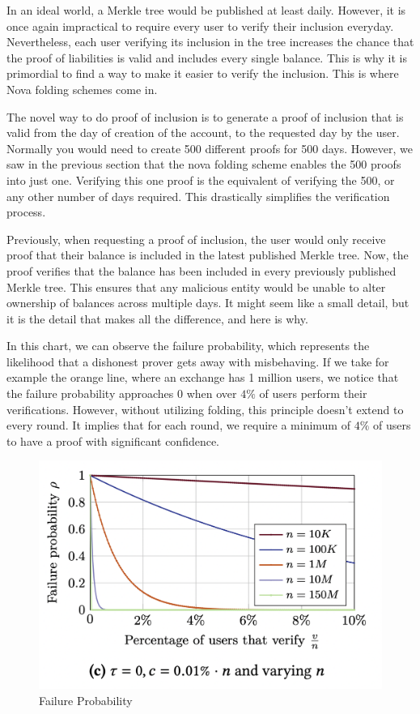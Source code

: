 In an ideal world, a Merkle tree would be published at least daily. However, it is once again impractical to require every user to verify their inclusion everyday.
Nevertheless, each user verifying its inclusion in the tree increases the chance that the proof of liabilities is valid and includes every single balance.
This is why it is primordial to find a way to make it easier to verify the inclusion. This is where Nova folding schemes come in.

The novel way to do proof of inclusion is to generate a proof of inclusion that is valid from the day of creation of the account, to the requested day by the user.
Normally you would need to create 500 different proofs for 500 days. However, we saw in the previous section that the nova folding scheme enables the 500 proofs into just one.
Verifying this one proof is the equivalent of verifying the 500, or any other number of days required.
This drastically simplifies the verification process.

Previously, when requesting a proof of inclusion, the user would only receive proof that their balance is included in the latest published Merkle tree. Now, the proof verifies that the balance has been included in every previously published Merkle tree.
This ensures that any malicious entity would be unable to alter ownership of balances across multiple days. It might seem like a small detail, but it is the detail that makes all the difference, and here is why.

In this chart, we can observe the failure probability, which represents the likelihood that a dishonest prover gets away with misbehaving.
If we take for example the orange line, where an exchange has 1 million users, we notice that the failure probability approaches 0 when over $4\%$ of users perform their verifications.
However, without utilizing folding, this principle doesn't extend to every round. It implies that for each round, we require a minimum of $4\%$ of users to have a proof with significant confidence.

\begin{figure}[H]
   \centering
   \includegraphics[width=130mm]{FailureProbability.png}
   \caption{Failure Probability \cite{GP21}}
   \label{overflow}
   \end{figure}


